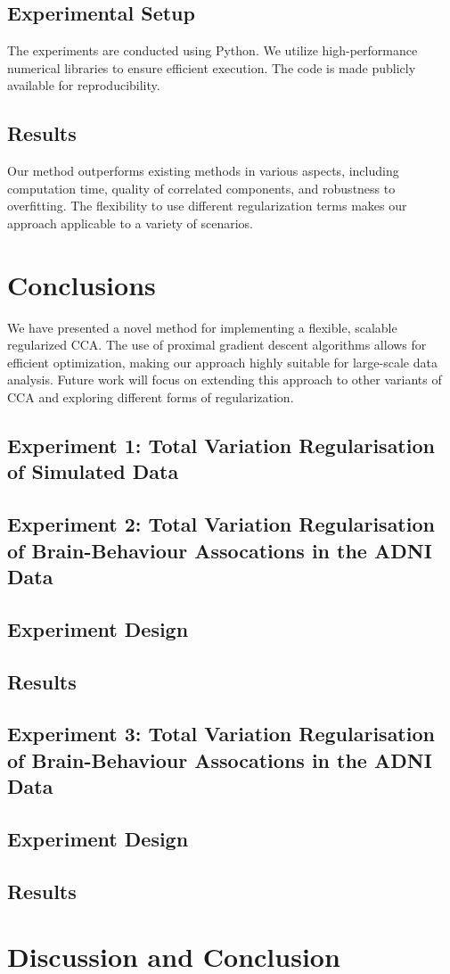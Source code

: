 \subsection{Experimental Setup}
The experiments are conducted using Python.
We utilize high-performance numerical libraries to ensure efficient execution.
The code is made publicly available for reproducibility.

\subsection{Results}
Our method outperforms existing methods in various aspects, including computation time, quality of correlated components, and robustness to overfitting.
The flexibility to use different regularization terms makes our approach applicable to a variety of scenarios.

\section{Conclusions}
We have presented a novel method for implementing a flexible, scalable regularized CCA. The use of proximal gradient descent algorithms allows for efficient optimization, making our approach highly suitable for large-scale data analysis.
Future work will focus on extending this approach to other variants of CCA and exploring different forms of regularization.



\subsection{Experiment 1: Total Variation Regularisation of Simulated Data}

\subsection{Experiment 2: Total Variation Regularisation of Brain-Behaviour Assocations in the ADNI Data}
\subsection{Experiment Design}
\subsection{Results}

\subsection{Experiment 3: Total Variation Regularisation of Brain-Behaviour Assocations in the ADNI Data}
\subsection{Experiment Design}
\subsection{Results}


\section{Discussion and Conclusion}


